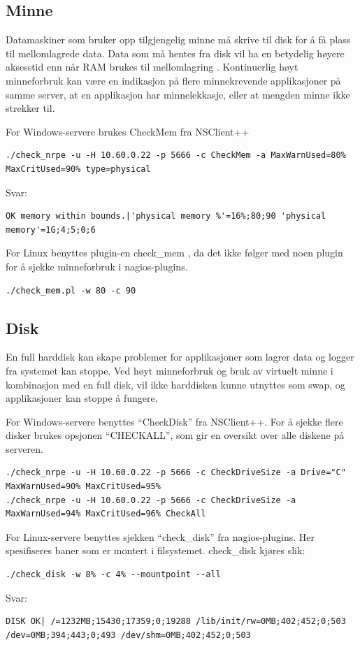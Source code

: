 \clearpage
\subsection{Minne}
Datamaskiner som bruker opp tilgjengelig minne må skrive til disk for å få plass til mellomlagrede data. Data som må hentes fra disk vil ha en betydelig høyere aksesstid enn når RAM brukes til mellomlagring \cite{wiki:mem}. 
Kontinuerlig høyt minneforbruk kan være en indikasjon på flere minnekrevende applikasjoner på samme server, at en applikasjon har minnelekkasje, eller at mengden minne ikke strekker til.

For Windows-servere brukes CheckMem fra NSClient++
\begin{lstlisting}[style=example]
./check_nrpe -u -H 10.60.0.22 -p 5666 -c CheckMem -a MaxWarnUsed=80% MaxCritUsed=90% type=physical
\end{lstlisting}
Svar:
\begin{lstlisting}[style=example]
OK memory within bounds.|'physical memory %'=16%;80;90 'physical memory'=1G;4;5;0;6
\end{lstlisting}

For Linux benyttes plugin-en check\_mem \cite{checklinuxmem}, da det ikke følger med noen plugin for å sjekke minneforbruk i nagios-plugins.
\begin{lstlisting}[style=example]
./check_mem.pl -w 80 -c 90
\end{lstlisting}
\subsection{Disk}
En full harddisk kan skape problemer for applikasjoner som lagrer data og logger fra systemet kan stoppe. Ved høyt minneforbruk og bruk av virtuelt minne i kombinasjon med en full disk, vil ikke harddisken kunne utnyttes som swap, og applikasjoner kan stoppe å fungere.

For Windows-servere benyttes ``CheckDisk'' fra NSClient++. For å sjekke flere disker brukes opsjonen ``CHECKALL'', som gir en oversikt over alle diskene på serveren.

\begin{lstlisting}[style=example]
./check_nrpe -u -H 10.60.0.22 -p 5666 -c CheckDriveSize -a Drive="C" MaxWarnUsed=90% MaxCritUsed=95%
./check_nrpe -u -H 10.60.0.22 -p 5666 -c CheckDriveSize -a MaxWarnUsed=94% MaxCritUsed=96% CheckAll
\end{lstlisting}

\clearpage
For Linux-servere benyttes sjekken ``check\_disk'' fra nagios-plugins. Her spesifiseres baner som er montert i filsystemet. check\_disk kjøres slik:
\begin{lstlisting}[style=example]
./check_disk -w 8% -c 4% --mountpoint --all
\end{lstlisting}
Svar: 
\begin{lstlisting}[style=example]
DISK OK| /=1232MB;15430;17359;0;19288 /lib/init/rw=0MB;402;452;0;503 /dev=0MB;394;443;0;493 /dev/shm=0MB;402;452;0;503
\end{lstlisting}


